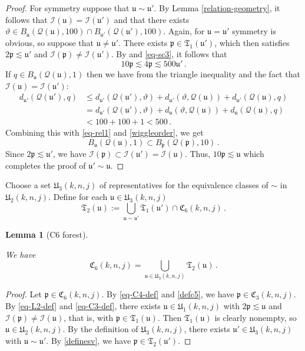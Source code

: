 \documentclass[10pt,a4paper]{article}
\theoremstyle{plain}
\newtheorem{lemma}[theorem]{Lemma}
\theoremstyle{definition}
\numberwithin{equation}{subsection}
\newcommand{\fp}{{\mathfrak p}}
\newcommand{\fu}{{\mathfrak u}}
\newcommand{\fU}{{\mathfrak U}}
\newcommand{\fT}{{\mathfrak T}}
\newcommand{\fC}{{\mathfrak C}}
\newcommand{\scI}{{\mathcal{I}}} %
\newcommand{\mfa}{{\vartheta}}
\newcommand{\fcc}{{\mathcal{Q}}}
\newcommand{\lean}[1]{}
\newcommand{\uses}[1]{}
\newcommand{\leanok}{}
\begin{document}
\begin{proof}
    For symmetry suppose that $\fu \sim \fu'$. By Lemma \eqref{relation-geometry}, it follows that $\scI(\fu) = \scI(\fu')$ and that there exists $\mfa \in B_{\fu}(\fcc(\fu), 100) \cap B_{\fu'}(\fcc(\fu'), 100)$. Again, for $\fu = \fu'$ symmetry is obvious, so suppose that $\fu \ne \fu'$. There exists $\fp \in \mathfrak{T}_1(\fu')$, which then satisfies $2\fp\lesssim \fu'$ and $\scI(\fp) \neq \scI(\fu')$. By  and \eqref{eq-sc3}, it follows that
    \begin{equation}
        \label{eq-rel1}
        10\fp \lesssim 4\fp \lesssim 500 \fu'\,.
    \end{equation}
    If $q \in B_{\fu}(\fcc(\fu),1)$ then we have from the triangle inequality and the fact that $\scI(\fu) = \scI(\fu')$:
    \begin{align*}
        d_{\fu'}(\fcc(\fu'), q) &\le d_{\fu'}(\fcc(\fu'), \mfa) + d_{\fu'}(\mfa, \fcc(\fu)) + d_{\fu'}(\fcc(\fu), q)\\
        &= d_{\fu'}(\fcc(\fu'), \mfa) + d_{\fu}(\mfa, \fcc(\fu)) + d_{\fu}(\fcc(\fu), q)\\
        &< 100 + 100 + 1 < 500\,.
    \end{align*}
    Combining this with \eqref{eq-rel1} and \eqref{wiggleorder}, we get
    \begin{equation*}
     B_{\fu}(\fcc(\fu), 1) \subset B_{\fp}(\fcc(\fp), 10)\, .
    \end{equation*}
    Since $2\fp \lesssim \fu'$, we have $\scI(\fp) \subset \scI(\fu') = \scI(\fu)$. Thus, $10\fp \lesssim \fu$ which completes the proof of $\fu' \sim \fu$.
\end{proof}

Choose a set $\fU_3(k,n,j)$ of representatives for the equivalence
classes of $\sim$ in $\fU_2(k,n,j)$.
Define for each $\fu\in \fU_3(k,n,j)$
\begin{equation}\label{definesv}
\fT_2(\fu):=
   \bigcup_{\fu\sim \fu'}\mathfrak{T}_1(\fu')\cap \fC_6(k,n,j)\, .
\end{equation}

\begin{lemma}[C6 forest]
\label{C6-forest}
\leanok
\lean{C6_forest}
\uses{equivalence-relation}
We have
\begin{equation}
    \fC_6(k,n,j)=\bigcup_{\fu\in \fU_3(k,n,j)}\mathfrak{T}_2(\fu)\, .
\end{equation}
\end{lemma}
\begin{proof}
    \leanok
    Let $\fp \in \fC_6(k,n,j)$.
    By \eqref{eq-C4-def} and \eqref{defc5}, we have $\fp \in \fC_3(k,n,j)$. By \eqref{eq-L2-def} and \eqref{eq-C3-def}, there exists $\fu \in \fU_1(k,n,j)$ with $2\fp \lesssim \fu$ and $\scI(\fp) \ne \scI(\fu)$, that is, with $\fp \in \mathfrak{T}_1(\fu)$. Then $\mathfrak{T}_1(\fu)$ is clearly nonempty, so $\fu \in \fU_2(k,n,j)$. By the definition of $\fU_3(k,n,j)$, there exists $\fu' \in \fU_3(k,n,j)$ with $\fu \sim \fu'$. By \eqref{definesv}, we have $\fp \in \mathfrak{T}_2(\fu')$.
\end{proof}
\end{document}
